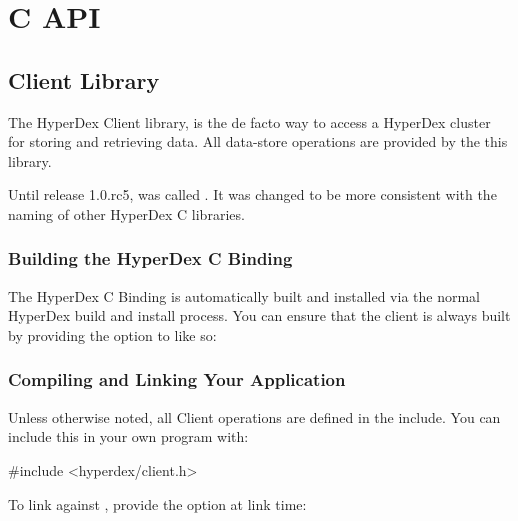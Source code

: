 \chapter{C API}
\label{chap:api:c}

\section{Client Library}
\label{sec:api:c:client}

The HyperDex Client library,  is the de facto way to
access a HyperDex cluster for storing and retrieving data.  All data-store
operations are provided by the this library.

Until release 1.0.rc5,  was called
.  It was changed to be more consistent with the naming of
other HyperDex C libraries.

\subsection{Building the HyperDex C Binding}
\label{sec:api:c:client:build}

The HyperDex C Binding is automatically built and installed via the normal
HyperDex build and install process.  You can ensure that the client is always
built by providing the  option to  like
so:

\begin{consolecode}
\end{consolecode}

\subsection{Compiling and Linking Your Application}
\label{sec:api:c:client:link}
Unless otherwise noted, all Client operations are defined in the
 include.  You can include this in your own program
with:

\begin{ccode}
#include <hyperdex/client.h>
\end{ccode}

To link against , provide the 
option at link time:

\begin{consolecode}
\end{consolecode}

